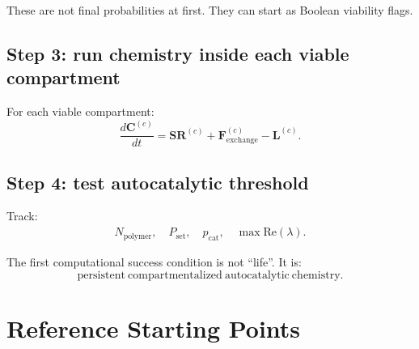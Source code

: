 \documentclass[11pt]{article}
\begin{document}
These are not final probabilities at first. They can start as Boolean
viability flags.

\subsection{Step 3: run chemistry inside each viable compartment}

For each viable compartment:
\begin{equation}
    \frac{d\mathbf{C}^{(c)}}{dt}
    =
    \mathbf{S}\mathbf{R}^{(c)}
    +
    \mathbf{F}_{\mathrm{exchange}}^{(c)}
    -
    \mathbf{L}^{(c)}.
\end{equation}

\subsection{Step 4: test autocatalytic threshold}

Track:
\begin{align}
    N_{\mathrm{polymer}},\quad
    P_{\mathrm{set}},\quad
    p_{\mathrm{cat}},\quad
    \max \mathrm{Re}(\lambda).
\end{align}

The first computational success condition is not ``life''. It is:
\begin{equation}
    \mathrm{persistent\ compartmentalized\ autocatalytic\ chemistry}.
\end{equation}

\section{Reference Starting Points}
\end{document}
